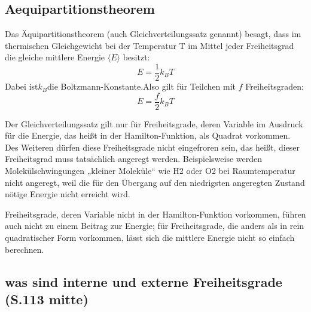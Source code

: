 \documentclass[]{article}
\begin{document}
\subsection{Aequipartitionstheorem}
Das Äquipartitionstheorem (auch Gleichverteilungssatz genannt) besagt, dass im thermischen Gleichgewicht bei der Temperatur T im Mittel jeder Freiheitsgrad die gleiche mittlere Energie $\langle E\rangle $ besitzt:
\begin{equation}
    E =\frac{1}{2} k_{B}T 
\end{equation}
Dabei ist$ k_{B} $die Boltzmann-Konstante.Also gilt für Teilchen mit $f$ Freiheitsgraden:
\begin{equation}
E =\frac{f}{2} k_{B}T
\end{equation}
   
Der Gleichverteilungssatz gilt nur für Freiheitsgrade, deren Variable im Ausdruck für die Energie, das heißt in der Hamilton-Funktion, als Quadrat vorkommen. Des Weiteren dürfen diese Freiheitsgrade nicht \glqq eingefroren \grqq sein, das heißt, dieser Freiheitsgrad muss tatsächlich angeregt werden. Beispielsweise werden Molekülschwingungen „kleiner Moleküle“ wie H2 oder O2 bei Raumtemperatur nicht angeregt, weil die für den Übergang auf den niedrigsten angeregten Zustand nötige Energie nicht erreicht wird.

Freiheitsgrade, deren Variable nicht in der Hamilton-Funktion vorkommen, führen auch nicht zu einem Beitrag zur Energie; für Freiheitsgrade, die anders als in rein quadratischer Form vorkommen, lässt sich die mittlere Energie nicht so einfach berechnen.

\subsection{was sind interne und externe Freiheitsgrade (S.113 mitte)}
\end{document}
